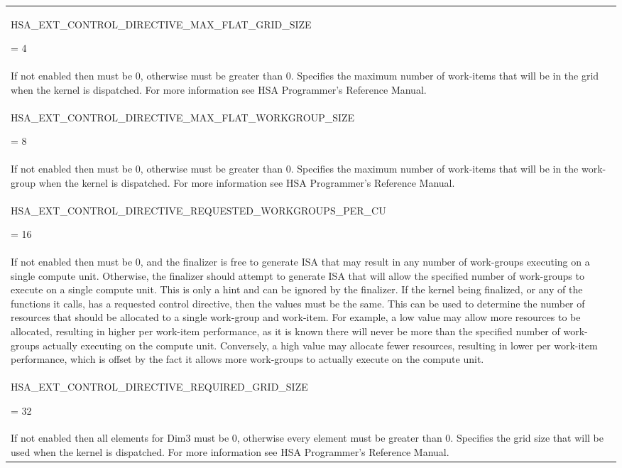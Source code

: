 \documentclass[final]{book}
\newcommand{\reftyp}[1]{#1}
\newcommand{\refenu}[1]{\reftyp{#1}}
\begin{document}
\begin{longtable}{@{\hspace{2em}}p{\linewidth-2em}}
\hspace{-2em}\hypertarget{group__finalizer_1gga143d9e622dfd7889d52fb5eb5ed1ffdba8f84c9f5303be293df76bf82b002299c}{\refenu{HSA_\-EXT_\-CONTROL_\-DIRECTIVE_\-MAX_\-FLAT_\-GRID_\-SIZE}} = 4\\If not enabled then must be 0, otherwise must be greater than 0. Specifies the maximum number of work-items that will be in the grid when the kernel is dispatched. For more information see HSA Programmer's Reference Manual.\\[2mm]
\hspace{-2em}\hypertarget{group__finalizer_1gga143d9e622dfd7889d52fb5eb5ed1ffdbaa0e6d7d860284c6cadde5c7e9db66968}{\refenu{HSA_\-EXT_\-CONTROL_\-DIRECTIVE_\-MAX_\-FLAT_\-WORKGROUP_\-SIZE}} = 8\\If not enabled then must be 0, otherwise must be greater than 0. Specifies the maximum number of work-items that will be in the work-group when the kernel is dispatched. For more information see HSA Programmer's Reference Manual.\\[2mm]
\hspace{-2em}\hypertarget{group__finalizer_1gga143d9e622dfd7889d52fb5eb5ed1ffdbae6659470b66232e7ec4a749a032dc95d}{\refenu{HSA_\-EXT_\-CONTROL_\-DIRECTIVE_\-REQUESTED_\-WORKGROUPS_\-PER_\-CU}} = 16\\If not enabled then must be 0, and the finalizer is free to generate ISA that may result in any number of work-groups executing on a single compute unit. Otherwise, the finalizer should attempt to generate ISA that will allow the specified number of work-groups to execute on a single compute unit. This is only a hint and can be ignored by the finalizer. If the kernel being finalized, or any of the functions it calls, has a requested control directive, then the values must be the same. This can be used to determine the number of resources that should be allocated to a single work-group and work-item. For example, a low value may allow more resources to be allocated, resulting in higher per work-item performance, as it is known there will never be more than the specified number of work-groups actually executing on the compute unit. Conversely, a high value may allocate fewer resources, resulting in lower per work-item performance, which is offset by the fact it allows more work-groups to actually execute on the compute unit.\\[2mm]
\hspace{-2em}\hypertarget{group__finalizer_1gga143d9e622dfd7889d52fb5eb5ed1ffdbaa9878485a06df4090cba80c85acb32be}{\refenu{HSA_\-EXT_\-CONTROL_\-DIRECTIVE_\-REQUIRED_\-GRID_\-SIZE}} = 32\\If not enabled then all elements for Dim3 must be 0, otherwise every element must be greater than 0. Specifies the grid size that will be used when the kernel is dispatched. For more information see HSA Programmer's Reference Manual.\\[2mm]

\end{longtable}
\end{document}
